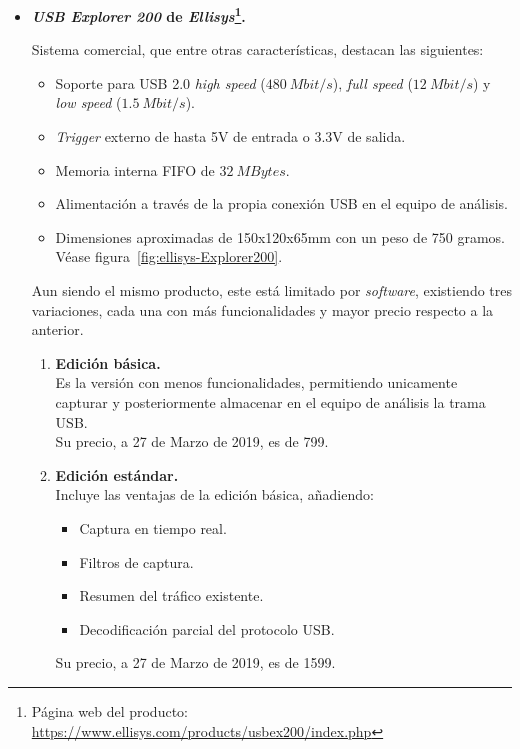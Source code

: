\begin{itemize}
    \item \textbf{\emph{USB Explorer 200} de \emph{Ellisys}\footnote{Página web del producto: \url{https://www.ellisys.com/products/usbex200/index.php}}.}
    
    Sistema comercial, que entre otras características\cite{ellisys2008}, destacan las siguientes:
    \begin{itemize}
        \item Soporte para USB 2.0 \emph{high speed} ($480~Mbit/s$), \emph{full speed} ($12~Mbit/s$) y \emph{low speed} ($1.5~Mbit/s$).
        \item \emph{Trigger} externo de hasta 5V de entrada o 3.3V de salida.
        \item Memoria interna FIFO de $32~MBytes$.
        \item Alimentación a través de la propia conexión USB en el equipo de análisis.
        \item Dimensiones aproximadas de 150x120x65mm con un peso de 750 gramos. Véase figura~\ref{fig:ellisys-Explorer200}.
    \end{itemize}

    Aun siendo el mismo producto, este está limitado por \emph{software}, existiendo tres variaciones, cada una con más funcionalidades y mayor precio respecto a la anterior.

    \begin{enumerate}
        \item \textbf{Edición básica.} \\
        Es la versión con menos funcionalidades, permitiendo unicamente capturar y posteriormente almacenar en el equipo de análisis la trama USB. \\
        Su precio, a 27 de Marzo de 2019, es de 799\texteuro.
      
        \item \textbf{Edición estándar.} \\
        Incluye las ventajas de la edición básica, añadiendo:
        \begin{itemize}
            \item Captura en tiempo real.
            \item Filtros de captura.
            \item Resumen del tráfico existente.
            \item Decodificación parcial del protocolo USB.
        \end{itemize}
        Su precio, a 27 de Marzo de 2019, es de 1599\texteuro.
        

\end{enumerate}
\end{itemize}
